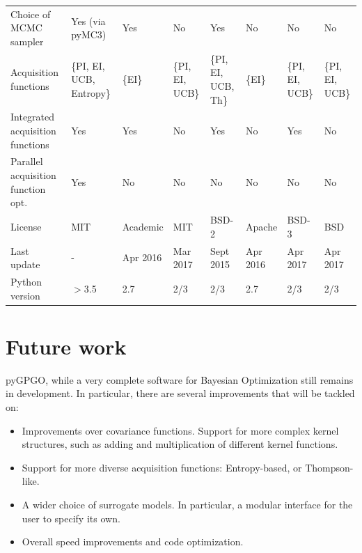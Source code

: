 \documentclass[10pt,a4paper,twoside]{book}
\begin{document}
\begin{table}
\begin{adjustbox}{width=1\textwidth}
\begin{tabular}{@{}llllllll@{}}
Choice of MCMC sampler             & {\color{green} Yes} (via pyMC3)          &  \color{green} Yes          & \color{red} No                       &  \color{green} Yes           &  \color{red} No      & \color{red} No             & \color{red} No               \\
Acquisition functions              & \{PI, EI, UCB, Entropy\} &  \{EI\}          & \{PI, EI, UCB\}           &  \{PI, EI, UCB, Th\}          &  \{EI\}      &       \{PI, EI, UCB\}          & \{PI, EI, UCB\}                   \\
Integrated acquisition functions   & \color{green} Yes                      &  \color{green} Yes       & \color{red} No                       &  \color{green} Yes           &  \color{red} No      & \color{green} Yes             & \color{red} No               \\
Parallel acquisition function opt. & \color{green} Yes                      & \color{red} No        & \color{red} No                       & \color{red} No         &   \color{red} No     & \color{red} No                 & \color{red} No               \\
License                            & MIT                      &   Academic         & MIT                       & BSD-2       & Apache       & BSD-3           & BSD               \\
Last update                        &            -              & Apr 2016 & Mar 2017  & Sept 2015           &   Apr 2016     &  Apr 2017                &     Apr 2017              \\
Python version & $>$3.5 & 2.7 & 2/3 & 2/3 & 2.7 & 2/3 & 2/3 \\ \bottomrule
\end{tabular}
\end{adjustbox}
\end{table}

\newpage
\section{Future work}

pyGPGO, while a very complete software for Bayesian Optimization still remains in development. In particular, there are several improvements that will be tackled on:

\begin{itemize}
	\item Improvements over covariance functions. Support for more complex kernel structures, such as adding and multiplication of different kernel functions.
	\item Support for more diverse acquisition functions: Entropy-based, or Thompson-like.
	\item A wider choice of surrogate models. In particular, a modular interface for the user to specify its own.
	\item Overall speed improvements and code optimization.
\end{itemize}
\end{document}
